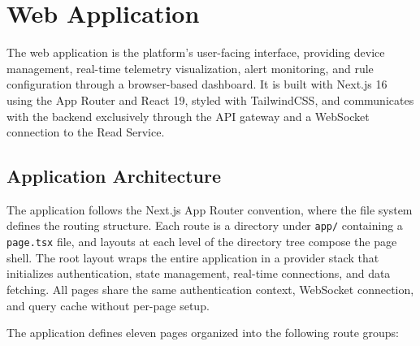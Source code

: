 
\section{Web Application}
\label{sec:WebApplication}

The web application is the platform's user-facing interface, providing device management, real-time telemetry visualization, alert monitoring, and rule configuration through a browser-based dashboard. It is built with Next.js 16 using the App Router and React 19, styled with TailwindCSS, and communicates with the backend exclusively through the \gls{API} gateway and a WebSocket connection to the Read Service.

\subsection{Application Architecture}
\label{subsec:WebAppArchitecture}

The application follows the Next.js App Router convention, where the file system defines the routing structure. Each route is a directory under \texttt{app/} containing a \texttt{page.tsx} file, and layouts at each level of the directory tree compose the page shell. The root layout wraps the entire application in a provider stack that initializes authentication, state management, real-time connections, and data fetching. All pages share the same authentication context, WebSocket connection, and query cache without per-page setup.

The application defines eleven pages organized into the following route groups:


